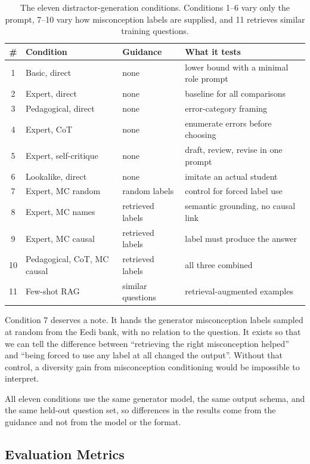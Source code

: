 \begin{table}[h]
\centering
\small
\begin{tabular}{@{}clll@{}}
\toprule
\textbf{\#} & \textbf{Condition} & \textbf{Guidance} & \textbf{What it tests} \\
\midrule
1 & Basic, direct & none & lower bound with a minimal role prompt \\
2 & Expert, direct & none & baseline for all comparisons \\
3 & Pedagogical, direct & none & error-category framing \\
4 & Expert, CoT & none & enumerate errors before choosing \\
5 & Expert, self-critique & none & draft, review, revise in one prompt \\
6 & Lookalike, direct & none & imitate an actual student \\
7 & Expert, MC random & random labels & control for forced label use \\
8 & Expert, MC names & retrieved labels & semantic grounding, no causal link \\
9 & Expert, MC causal & retrieved labels & label must produce the answer \\
10 & Pedagogical, CoT, MC causal & retrieved labels & all three combined \\
11 & Few-shot RAG & similar questions & retrieval-augmented examples \\
\bottomrule
\end{tabular}
\caption{The eleven distractor-generation conditions. Conditions 1--6 vary only the prompt, 7--10 vary how misconception labels are supplied, and 11 retrieves similar training questions.}
\label{tab:mcq-conditions}
\end{table}

Condition 7 deserves a note. It hands the generator misconception labels sampled at random from the Eedi bank, with no relation to the question. It exists so that we can tell the difference between ``retrieving the right misconception helped'' and ``being forced to use any label at all changed the output''. Without that control, a diversity gain from misconception conditioning would be impossible to interpret.

All eleven conditions use the same generator model, the same output schema, and the same held-out question set, so differences in the results come from the guidance and not from the model or the format.

\subsection{Evaluation Metrics}

